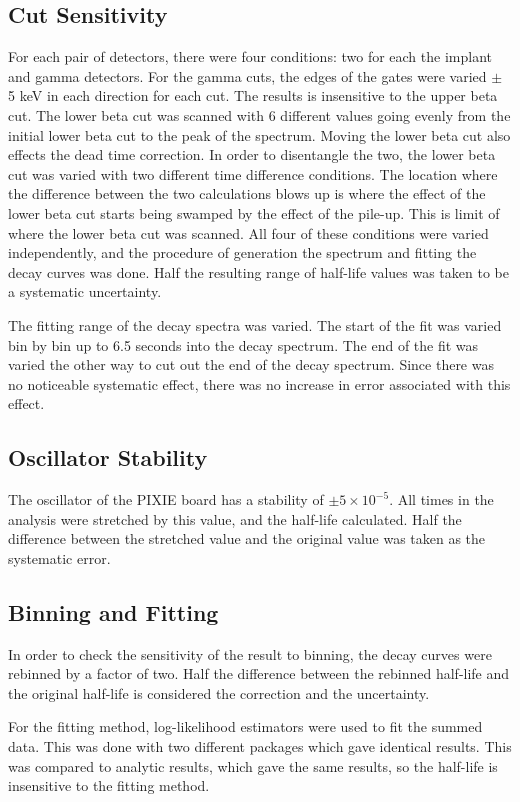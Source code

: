 \documentclass[MaxHughesThesis.tex]{subfiles}
\begin{document}
\subsection{Cut Sensitivity}
For each pair of detectors, there were four conditions: two for each the implant and gamma detectors. 
For the gamma cuts, the edges of the gates were varied $\pm$ 5 keV in each direction for each cut.
The results is insensitive to the upper beta cut.
The lower beta cut was scanned with 6 different values going evenly from the initial lower beta cut to the peak of the spectrum.
Moving the lower beta cut also effects the dead time correction.
In order to disentangle the two, the lower beta cut was varied with two different time difference conditions.
The location where the difference between the two calculations blows up is where the effect of the lower beta cut starts being swamped by the effect of the pile-up.
This is limit of where the lower beta cut was scanned.
All four of these conditions were varied independently, and the procedure of generation the spectrum and fitting the decay curves was done.
Half the resulting range of half-life values was taken to be a systematic uncertainty.
	
The fitting range of the decay spectra was varied. 
The start of the fit was varied bin by bin up to 6.5 seconds into the decay spectrum.
The end of the fit was varied the other way to cut out the end of the decay spectrum.
Since there was no noticeable systematic effect, there was no increase in error associated with this effect.

\subsection{Oscillator Stability}
The oscillator of the PIXIE board has a stability of $\pm 5 \times 10^{-5}$.
All times in the analysis were stretched by this value, and the half-life calculated.
Half the difference between the stretched value and the original value was taken as the systematic error. 

\subsection{Binning and Fitting}
In order to check the sensitivity of the result to binning, the decay curves were rebinned by a factor of two.
Half the difference between the rebinned half-life and the original half-life is considered the correction and the uncertainty.

For the fitting method, log-likelihood estimators were used to fit the summed data.
This was done with two different packages which gave identical results. 
This was compared to analytic results, which gave the same results, so the half-life is insensitive to the fitting method.
\end{document}
